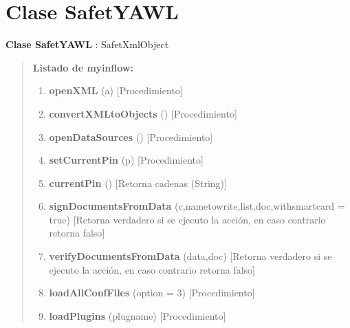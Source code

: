 \documentclass[letterpaper,11pt,spanish]{sphinxmanual}
\begin{document}
\chapter{Clase SafetYAWL}
\label{_templates/Contenido5/Clase5:clase-safetyawl}\label{_templates/Contenido5/Clase5::doc}
\textbf{Clase SafetYAWL} : SafetXmlObject
\begin{quote}

\textbf{Listado de myinflow:}
\begin{enumerate}
\item {} 
\textbf{openXML} (a) {[}Procedimiento{]}

\item {} 
\textbf{convertXMLtoObjects} () {[}Procedimiento{]}

\item {} 
\textbf{openDataSources} () {[}Procedimiento{]}

\item {} 
\textbf{setCurrentPin} (p) {[}Procedimiento{]}

\item {} 
\textbf{currentPin} () {[}Retorna cadenas (String){]}

\item {} 
\textbf{signDocumentsFromData} (c,nametowrite,list,doc,withsmartcard = true) {[}Retorna verdadero si se ejecuto la acción, en caso contrario retorna falso{]}

\item {} 
\textbf{verifyDocumentsFromData} (data,doc) {[}Retorna verdadero si se ejecuto la acción, en caso contrario retorna falso{]}

\item {} 
\textbf{loadAllConfFiles} (option = 3) {[}Procedimiento{]}

\item {} 
\textbf{loadPlugins} (plugname) {[}Procedimiento{]}

\end{enumerate}
\end{quote}
\end{document}
